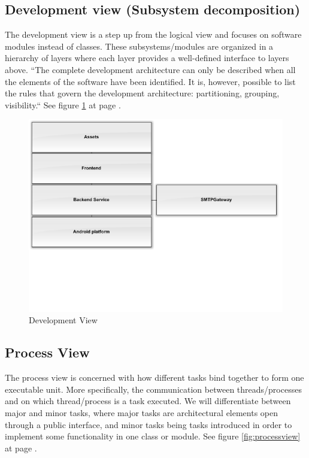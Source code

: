 \subsection{Development view (Subsystem decomposition)}
The development view is a step up from the logical view and focuses on software modules instead of classes. These subsystems/modules are organized in a hierarchy of layers where each layer provides a well-defined interface to layers above. “The complete development architecture can only be described when all the elements of the software have been identified. It is, however, possible to list the rules that govern the development architecture: partitioning, grouping, visibility.“
See figure \ref{fig:developmentview} at page \pageref{fig:developmentview}.

\begin{figure}
	\includegraphics[width=\textwidth]{developmentview.png}
	\caption{Development View}
	\label{fig:developmentview}
\end{figure}

\subsection{Process View}
The process view is concerned with how different tasks bind together to form one executable unit. More specifically, the communication between threads/processes and on which thread/process is a task executed. We will differentiate between major and minor tasks, where major tasks are architectural elements open through a public interface, and minor tasks being tasks introduced in order to implement some functionality in one class or module.
See figure \ref{fig:processview} at page \pageref{fig:processview}.

